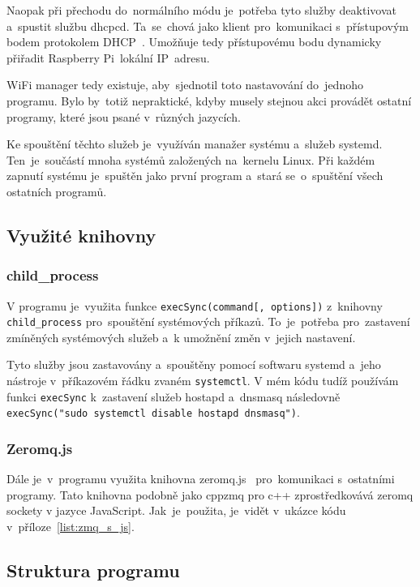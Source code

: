 Naopak při přechodu do~normálního  módu je~potřeba tyto služby deaktivovat a~spustit službu dhcpcd. Ta~se~chová jako klient pro~komunikaci s~přístupovým bodem protokolem DHCP~\cite{dhcpcd}. Umožňuje tedy přístupovému bodu dynamicky přiřadit Raspberry Pi~lokální IP~adresu.

WiFi manager tedy existuje, aby~sjednotil toto nastavování do~jednoho programu. Bylo by~totiž nepraktické, kdyby musely stejnou akci provádět ostatní programy, které jsou psané v~různých jazycích.

Ke spouštění těchto služeb je~využíván manažer systému a~služeb systemd. Ten~je~součástí mnoha systémů založených na~kernelu Linux. Při každém zapnutí systému je~spuštěn jako první program a~stará se~o~spuštění všech ostatních programů.~\cite{systemd}

\subsection{Využité knihovny}
\subsubsection{child\_process}
V programu je~využita funkce \texttt{execSync(command[, options])} z~knihovny \texttt{child_process} pro~spouštění systémových příkazů. To~je~potřeba pro~zastavení zmíněných systémových služeb a~k umožnění změn v~jejich nastavení.

Tyto služby jsou zastavovány a~spouštěny pomocí softwaru systemd a~jeho nástroje v~příkazovém řádku zvaném \texttt{systemctl}.
V mém kódu tudíž používám funkci \texttt{execSync} k~zastavení služeb hostapd a~dnsmasq následovně \texttt{execSync("sudo systemctl disable hostapd dnsmasq")}.

\subsubsection{Zeromq.js}
Dále je~v~programu využita knihovna zeromq.js~\cite{zeromqjs} pro~komunikaci s~ostatními programy. Tato knihovna podobně jako cppzmq pro c++ zprostředkovává zeromq sockety v jazyce JavaScript. Jak~je~použita, je~vidět v~ukázce kódu v~příloze~\ref{list:zmq_s_js}.

\subsection{Struktura programu}


